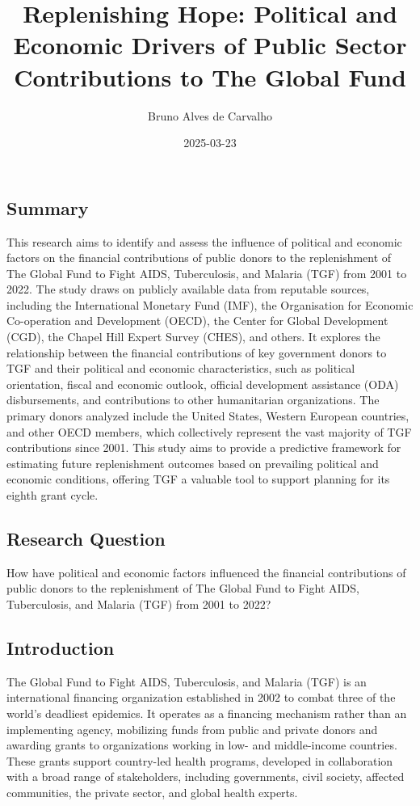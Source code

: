 \documentclass[
]{article}
\title{Replenishing Hope: Political and Economic Drivers of Public
Sector Contributions to The Global Fund}
\author{Bruno Alves de Carvalho}
\date{2025-03-23}
\begin{document}
\maketitle

\subsection{Summary}\label{summary}

This research aims to identify and assess the influence of political and
economic factors on the financial contributions of public donors to the
replenishment of The Global Fund to Fight AIDS, Tuberculosis, and
Malaria (TGF) from 2001 to 2022. The study draws on publicly available
data from reputable sources, including the International Monetary Fund
(IMF), the Organisation for Economic Co-operation and Development
(OECD), the Center for Global Development (CGD), the Chapel Hill Expert
Survey (CHES), and others. It explores the relationship between the
financial contributions of key government donors to TGF and their
political and economic characteristics, such as political orientation,
fiscal and economic outlook, official development assistance (ODA)
disbursements, and contributions to other humanitarian organizations.
The primary donors analyzed include the United States, Western European
countries, and other OECD members, which collectively represent the vast
majority of TGF contributions since 2001. This study aims to provide a
predictive framework for estimating future replenishment outcomes based
on prevailing political and economic conditions, offering TGF a valuable
tool to support planning for its eighth grant cycle.

\subsection{Research Question}\label{research-question}

How have political and economic factors influenced the financial
contributions of public donors to the replenishment of The Global Fund
to Fight AIDS, Tuberculosis, and Malaria (TGF) from 2001 to 2022?

\subsection{Introduction}\label{introduction}

The Global Fund to Fight AIDS, Tuberculosis, and Malaria (TGF) is an
international financing organization established in 2002 to combat three
of the world's deadliest epidemics. It operates as a financing mechanism
rather than an implementing agency, mobilizing funds from public and
private donors and awarding grants to organizations working in low- and
middle-income countries. These grants support country-led health
programs, developed in collaboration with a broad range of stakeholders,
including governments, civil society, affected communities, the private
sector, and global health experts.
\end{document}

